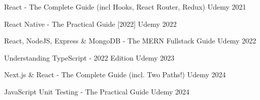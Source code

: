 
\begin{cvcertifications}

  \cvcert
    {React - The Complete Guide (incl Hooks, React Router, Redux)} %
    {Udemy} %
    {2021} %
    {} %

  \cvcert
    {React Native - The Practical Guide [2022]} %
    {Udemy} %
    {2022} %
    {} %

  \cvcert
    {React, NodeJS, Express \& MongoDB - The MERN Fullstack Guide} %
    {Udemy} %
    {2022} %
    {} %

  \cvcert
    {Understanding TypeScript - 2022 Edition} %
    {Udemy} %
    {2023} %
    {} %
    
  \cvcert
    {Next.js \& React - The Complete Guide (incl. Two Paths!)} %
    {Udemy} %
    {2024} %
    {} %

  \cvcert
    {JavaScript Unit Testing - The Practical Guide} %
    {Udemy} %
    {2024} %
    {} %

\end{cvcertifications}

